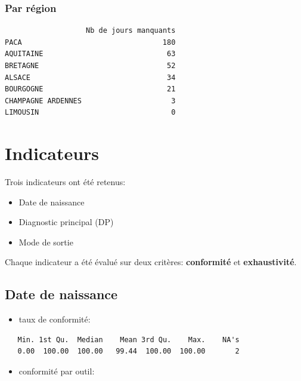 \documentclass[]{article}
\begin{document}
\subsubsection{Par région}\label{par-region}

\begin{verbatim}
                   Nb de jours manquants
PACA                                 180
AQUITAINE                             63
BRETAGNE                              52
ALSACE                                34
BOURGOGNE                             21
CHAMPAGNE ARDENNES                     3
LIMOUSIN                               0
\end{verbatim}

\section{Indicateurs}\label{indicateurs}

Trois indicateurs ont été retenus:

\begin{itemize}
\itemsep1pt\parskip0pt
\item
  Date de naissance
\item
  Diagnostic principal (DP)
\item
  Mode de sortie
\end{itemize}

Chaque indicateur a été évalué sur deux critères: \textbf{conformité} et
\textbf{exhaustivité}.

\subsection{Date de naissance}\label{date-de-naissance}

\begin{itemize}
\itemsep1pt\parskip0pt
\item
  taux de conformité:
\end{itemize}

\begin{verbatim}
   Min. 1st Qu.  Median    Mean 3rd Qu.    Max.    NA's 
   0.00  100.00  100.00   99.44  100.00  100.00       2 
\end{verbatim}

\begin{itemize}
\itemsep1pt\parskip0pt
\item
  conformité par outil:
\end{itemize}
\end{document}
